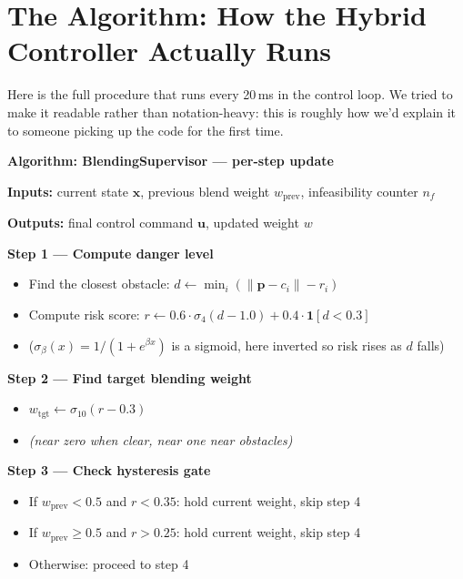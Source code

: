 \documentclass[12pt,a4paper]{article}
\begin{document}
\section{The Algorithm: How the Hybrid Controller Actually Runs}

Here is the full procedure that runs every 20\,ms in the control loop.
We tried to make it readable rather than notation-heavy: this is
roughly how we'd explain it to someone picking up the code for the first time.

\medskip

\begin{mdframed}[backgroundcolor=gray!6, linecolor=gray!40, linewidth=1pt,
  innertopmargin=10pt, innerbottommargin=10pt,
  innerleftmargin=12pt, innerrightmargin=8pt]

\textbf{Algorithm: BlendingSupervisor — per-step update}

\medskip
\textbf{Inputs:} current state $\mathbf{x}$, previous blend weight $w_{\text{prev}}$,
infeasibility counter $n_f$

\textbf{Outputs:} final control command $\mathbf{u}$, updated weight $w$

\medskip
\textbf{Step 1 — Compute danger level}
\begin{itemize}[leftmargin=1.5cm, itemsep=1pt]
  \item Find the closest obstacle: $d \leftarrow \min_i(\|\mathbf{p} - c_i\| - r_i)$
  \item Compute risk score: $r \leftarrow 0.6 \cdot \sigma_4(d - 1.0) + 0.4 \cdot \mathbf{1}[d < 0.3]$
  \item ($\sigma_\beta(x) = 1/(1 + e^{\beta x})$ is a sigmoid, here inverted so risk rises as $d$ falls)
\end{itemize}

\textbf{Step 2 — Find target blending weight}
\begin{itemize}[leftmargin=1.5cm, itemsep=1pt]
  \item $w_{\text{tgt}} \leftarrow \sigma_{10}(r - 0.3)$
  \item \textit{(near zero when clear, near one near obstacles)}
\end{itemize}

\textbf{Step 3 — Check hysteresis gate}
\begin{itemize}[leftmargin=1.5cm, itemsep=1pt]
  \item If $w_{\text{prev}} < 0.5$ and $r < 0.35$: hold current weight, skip step 4
  \item If $w_{\text{prev}} \geq 0.5$ and $r > 0.25$: hold current weight, skip step 4
  \item Otherwise: proceed to step 4
\end{itemize}


\end{mdframed}
\end{document}
